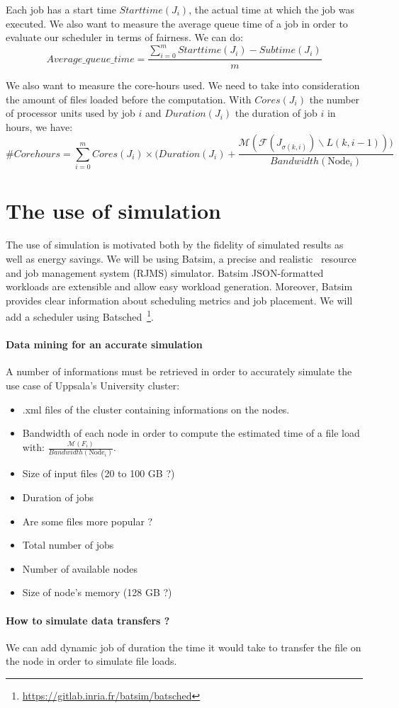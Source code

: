 \documentclass[a4paper]{article}
\newcommand{\Node}[1]{\ensuremath{\mathrm{Node}_{#1}}\xspace}
\newcommand{\inputs}{\ensuremath{\mathcal{F}}\xspace}
\newcommand{\memory}{\ensuremath{\mathcal{M}}\xspace}
\newcommand{\duration}{\mathit{Duration}\xspace}
\newcommand{\core}{\mathit{Cores}\xspace}
\newcommand{\submissiontime}{\mathit{Subtime}\xspace}
\newcommand{\start}{\mathit{Starttime}\xspace}
\newcommand{\live}{\ensuremath{L}\xspace}
\begin{document}
Each job has a start time $\start(J_i)$, the actual time at which the job was executed.
We also want to measure the average queue time of a job in order
to evaluate our scheduler in terms of fairness. We can do:
$$
	Average\_queue\_time = \frac{\sum^{m}_{i = 0} \start(J_i) - \submissiontime(J_i)}{m}
$$

We also want to measure the core-hours used. We need to take into consideration the amount of files loaded before the computation.
With $\core(J_i)$ the number of processor units used by job $i$ and $\duration(J_i)$ the duration of job $i$ in hours, we have:
$$
	\#Corehours = \sum^{m}_{i = 0} \core(J_i) \times (\duration(J_i) + \frac{\memory(\inputs\left(J_{\sigma(k,i)}\right) \backslash \live(k,i-1)))}{\mathit{Bandwidth(\Node{i})}}
$$

\section{The use of simulation}

The use of simulation is motivated both by the fidelity of simulated results as well as energy savings. 
We will be using Batsim, a precise and realistic~\cite{Batsim} resource and job management system (RJMS) simulator.
Batsim JSON-formatted workloads are extensible and allow easy workload generation. 
Moreover, Batsim provides clear information about scheduling metrics and job placement.
We will add a scheduler using Batsched~\footnote{\url{https://gitlab.inria.fr/batsim/batsched}}.

\paragraph{Data mining for an accurate simulation}
A number of informations must be retrieved in order to accurately 
simulate the use case of Uppsala's University cluster:
\begin{itemize}
	\item	.xml files of the cluster containing informations on the nodes.
	\item	Bandwidth of each node in order to compute the estimated time of a file load with: $\frac{\memory(F_i)}{\mathit{Bandwidth(\Node{i})}}$.
	\item	Size of input files (20 to 100 GB ?)
	\item	Duration of jobs
	\item	Are some files more popular ?
	\item	Total number of jobs
	\item	Number of available nodes
	\item	Size of node's memory (128 GB ?)
\end{itemize}

\paragraph{How to simulate data transfers ?}
We can add dynamic job of duration the time it would take to transfer the file on the node in order
to simulate file loads.

\printbibliography
\end{document}
